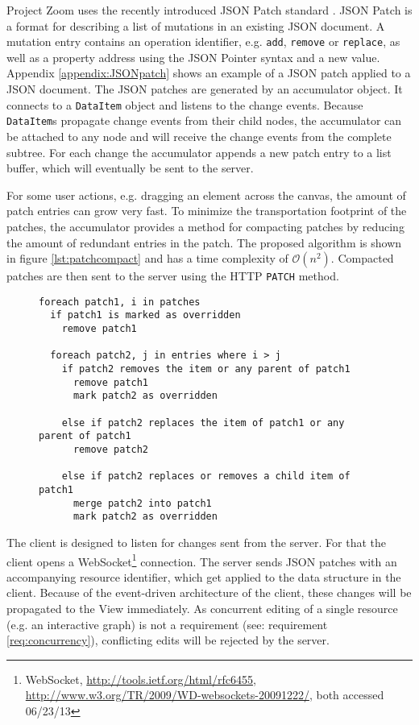 Project Zoom uses the recently introduced JSON Patch standard \cite{RFC6902}. JSON Patch is a format for describing a list of mutations in an existing JSON document. A mutation entry contains an operation identifier, e.g. \texttt{add}, \texttt{remove} or \texttt{replace}, as well as a property address using the JSON Pointer syntax and a new value. Appendix \ref{appendix:JSONpatch} shows an example of a JSON patch applied to a JSON document. 
The JSON patches are generated by an accumulator object. It connects to a \texttt{DataItem} object and listens to the change events. Because \texttt{DataItem}s propagate change events from their child nodes, the accumulator can be attached to any node and will receive the change events from the complete subtree. For each change the accumulator appends a new patch entry to a list buffer, which will eventually be sent to the server.

For some user actions, e.g. dragging an element across the canvas, the amount of patch entries can grow very fast. To minimize the transportation footprint of the patches, the accumulator provides a method for compacting patches by reducing the amount of redundant entries in the patch. The proposed algorithm is shown in figure \ref{lst:patchcompact} and has a time complexity of $\mathcal O(n^2)$. Compacted patches are then sent to the server using the HTTP \texttt{PATCH} method.

\begin{figure}
\begin{lstlisting}[language=pseudo,caption={Pseudo code for compacting a chronologically ordered list of JSON patches},label={lst:patchcompact}]
foreach patch1, i in patches
  if patch1 is marked as overridden
    remove patch1
  
  foreach patch2, j in entries where i > j
    if patch2 removes the item or any parent of patch1
      remove patch1
      mark patch2 as overridden
      
    else if patch2 replaces the item of patch1 or any parent of patch1
      remove patch2
     
    else if patch2 replaces or removes a child item of patch1
      merge patch2 into patch1
      mark patch2 as overridden    
\end{lstlisting}
\end{figure}

The client is designed to listen for changes sent from the server. For that the client opens a WebSocket\footnote{WebSocket, \url{http://tools.ietf.org/html/rfc6455}, \url{http://www.w3.org/TR/2009/WD-websockets-20091222/}, both accessed 06/23/13} connection. The server sends JSON patches with an accompanying resource identifier, which get applied to the data structure in the client. Because of the event-driven architecture of the client, these changes will be propagated to the View immediately. As concurrent editing of a single resource (e.g. an interactive graph) is not a requirement (see: requirement \ref{req:concurrency}), conflicting edits will be rejected by the server.


